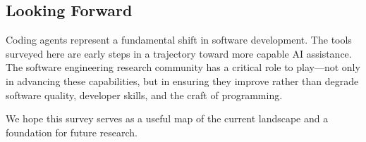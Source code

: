 \subsection{Looking Forward}

Coding agents represent a fundamental shift in software development. The tools surveyed here are early steps in a trajectory toward more capable AI assistance. The software engineering research community has a critical role to play---not only in advancing these capabilities, but in ensuring they improve rather than degrade software quality, developer skills, and the craft of programming.

We hope this survey serves as a useful map of the current landscape and a foundation for future research.
